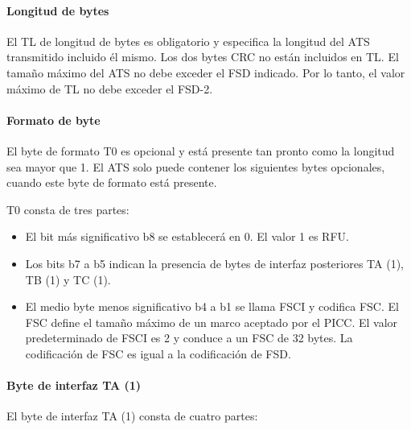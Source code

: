 \paragraph{Longitud de bytes}
El TL de longitud de bytes es obligatorio y especifica la longitud del ATS transmitido incluido él mismo. Los dos bytes CRC no están incluidos en TL. El tamaño máximo del ATS no debe exceder el FSD indicado. Por lo tanto, el valor máximo de TL no debe exceder el FSD-2.\par

\paragraph{Formato de byte}
El byte de formato T0 es opcional y está presente tan pronto como la longitud sea mayor que 1. El ATS solo puede contener los siguientes bytes opcionales, cuando este byte de formato está presente.\par

T0 consta de tres partes:\par

\begin{itemize}
	\item El bit más significativo b8 se establecerá en 0. El valor 1 es RFU.\par

	\item Los bits b7 a b5 indican la presencia de bytes de interfaz posteriores TA (1), TB (1) y TC (1).\par

	\item El medio byte menos significativo b4 a b1 se llama FSCI y codifica FSC. El FSC define el tamaño máximo de un marco aceptado por el PICC. El valor predeterminado de FSCI es 2 y conduce a un FSC de 32 bytes. La codificación de FSC es igual a la codificación de FSD.
\end{itemize}\par

\paragraph{Byte de interfaz TA (1)}
El byte de interfaz TA (1) consta de cuatro partes:\par

